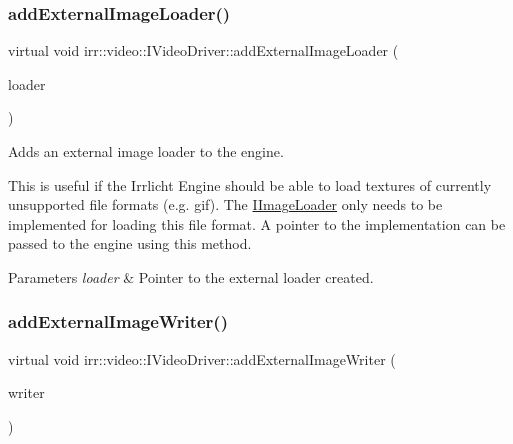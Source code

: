 \subsubsection{\texorpdfstring{add\+External\+Image\+Loader()}{addExternalImageLoader()}\hspace{0.1cm}{\footnotesize\ttfamily [2/2]}}
{\footnotesize\ttfamily virtual void irr\+::video\+::\+I\+Video\+Driver\+::add\+External\+Image\+Loader (\begin{DoxyParamCaption}\item[{\hyperlink{classirr_1_1video_1_1IImageLoader}{I\+Image\+Loader} $\ast$}]{loader }\end{DoxyParamCaption})\hspace{0.3cm}{\ttfamily [pure virtual]}}



Adds an external image loader to the engine. 

This is useful if the Irrlicht Engine should be able to load textures of currently unsupported file formats (e.\+g. gif). The \hyperlink{classirr_1_1video_1_1IImageLoader}{I\+Image\+Loader} only needs to be implemented for loading this file format. A pointer to the implementation can be passed to the engine using this method. 
\begin{DoxyParams}{Parameters}
{\em loader} & Pointer to the external loader created. \\
\hline
\end{DoxyParams}
\mbox{\label{classirr_1_1video_1_1IVideoDriver_a56160e0d88346e04db921fbe4635a7ae}} 
\subsubsection{\texorpdfstring{add\+External\+Image\+Writer()}{addExternalImageWriter()}\hspace{0.1cm}{\footnotesize\ttfamily [1/2]}}
{\footnotesize\ttfamily virtual void irr\+::video\+::\+I\+Video\+Driver\+::add\+External\+Image\+Writer (\begin{DoxyParamCaption}\item[{\hyperlink{classirr_1_1video_1_1IImageWriter}{I\+Image\+Writer} $\ast$}]{writer }\end{DoxyParamCaption})\hspace{0.3cm}{\ttfamily [pure virtual]}}



